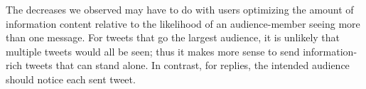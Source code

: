 \documentclass[11pt,letterpaper]{article}
\begin{document}
The decreases we observed may have to do with users optimizing the amount of information content relative to the likelihood of an audience-member seeing more than one message. For tweets that go the largest audience, it is unlikely that multiple tweets would all be seen; thus it makes more sense to send information-rich tweets that can stand alone. In contrast, for replies, the intended audience should notice each sent tweet. 

%
%
%
\end{document}
